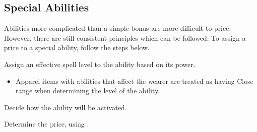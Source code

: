 \subsection{Special Abilities}

Abilities more complicated than a simple bonus are more difficult to price. However, there are still consistent principles which can be followed. To assign a price to a special ability, follow the steps below.
\begin{enumerate*}
    \item Assign an effective spell level to the ability based on its power.
        \begin{itemize}
            \item Apparel items with abilities that affect the wearer are treated as having Close range when determining the level of the ability.
        \end{itemize}
    \item Decide how the ability will be activated.
    \item Determine the price, using .
\end{enumerate*}

